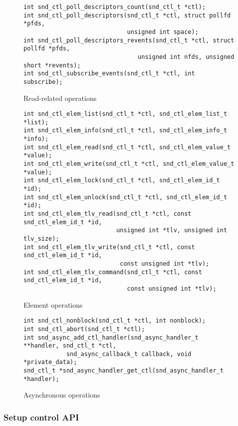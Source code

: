 \documentclass[onecolumn]{article}
\begin{document}
\begin{figure}[htbp]
\small
\begin{verbatim}
int snd_ctl_poll_descriptors_count(snd_ctl_t *ctl);
int snd_ctl_poll_descriptors(snd_ctl_t *ctl, struct pollfd *pfds,
                             unsigned int space);
int snd_ctl_poll_descriptors_revents(snd_ctl_t *ctl, struct pollfd *pfds,
                                unsigned int nfds, unsigned short *revents);
int snd_ctl_subscribe_events(snd_ctl_t *ctl, int subscribe);
\end{verbatim}
\caption{{Read-related operations}}
\label{read-related-operations}
\end{figure}


\begin{figure}[htbp]
\small
\begin{verbatim}
int snd_ctl_elem_list(snd_ctl_t *ctl, snd_ctl_elem_list_t *list);
int snd_ctl_elem_info(snd_ctl_t *ctl, snd_ctl_elem_info_t *info);
int snd_ctl_elem_read(snd_ctl_t *ctl, snd_ctl_elem_value_t *value);
int snd_ctl_elem_write(snd_ctl_t *ctl, snd_ctl_elem_value_t *value);
int snd_ctl_elem_lock(snd_ctl_t *ctl, snd_ctl_elem_id_t *id);
int snd_ctl_elem_unlock(snd_ctl_t *ctl, snd_ctl_elem_id_t *id);
int snd_ctl_elem_tlv_read(snd_ctl_t *ctl, const snd_ctl_elem_id_t *id,
                          unsigned int *tlv, unsigned int tlv_size);
int snd_ctl_elem_tlv_write(snd_ctl_t *ctl, const snd_ctl_elem_id_t *id,
                           const unsigned int *tlv);
int snd_ctl_elem_tlv_command(snd_ctl_t *ctl, const snd_ctl_elem_id_t *id,
                             const unsigned int *tlv);
\end{verbatim}
\caption{{Element operations}}
\label{element-operations}
\end{figure}


\begin{figure}[htbp]
\small
\begin{verbatim}
int snd_ctl_nonblock(snd_ctl_t *ctl, int nonblock);
int snd_ctl_abort(snd_ctl_t *ctl);
int snd_async_add_ctl_handler(snd_async_handler_t **handler, snd_ctl_t *ctl, 
			snd_async_callback_t callback, void *private_data);
snd_ctl_t *snd_async_handler_get_ctl(snd_async_handler_t *handler);
\end{verbatim}
\caption{{Asynchronous operations}}
\label{async-operations}
\end{figure}

\subsubsection{Setup control API}
\end{document}
